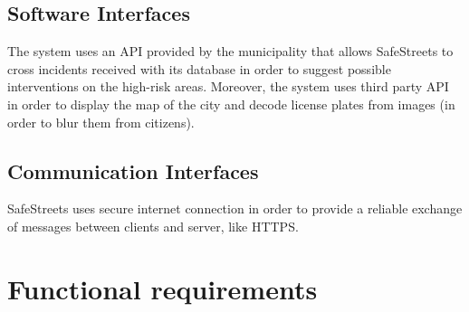 \documentclass[../RASD.tex]{subfiles}
\begin{document}
            \subsection{Software Interfaces}\label{subsec:software-interfaces}
            The system uses an API provided by the municipality that allows SafeStreets to cross incidents received with its database in order to suggest possible interventions on the high-risk areas. Moreover, the system uses third party API in order to display the map of the city and decode license plates from images (in order to blur them from citizens).
            \subsection{Communication Interfaces}\label{subsec:communication-interface}
            SafeStreets uses secure internet connection in order to provide a reliable exchange of messages between clients and server, like HTTPS.
        \section{Functional requirements}\label{sec:functional-requirements}
\end{document}
